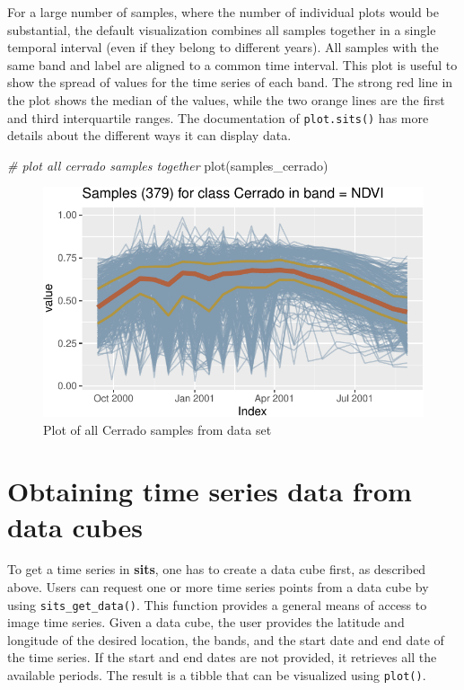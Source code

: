 \documentclass[a4paper,]{tufte-book}
\newenvironment{Shaded}{}{}
\newcommand{\CommentTok}[1]{\textcolor[rgb]{0.38,0.63,0.69}{\textit{#1}}}
\newcommand{\FunctionTok}[1]{\textcolor[rgb]{0.02,0.16,0.49}{#1}}
\newcommand{\NormalTok}[1]{#1}
\begin{document}
For a large number of samples, where the number of individual plots would be substantial, the default visualization combines all samples together in a single temporal interval (even if they belong to different years). All samples with the same band and label are aligned to a common time interval. This plot is useful to show the spread of values for the time series of each band. The strong red line in the plot shows the median of the values, while the two orange lines are the first and third interquartile ranges. The documentation of \texttt{plot.sits()} has more details about the different ways it can display data.

\begin{Shaded}
\begin{Highlighting}[]
\CommentTok{\# plot all cerrado samples together}
\FunctionTok{plot}\NormalTok{(samples\_cerrado)}
\end{Highlighting}
\end{Shaded}

\begin{figure}

{\centering \includegraphics[width=0.7\linewidth]{sitsbook_files/figure-latex/unnamed-chunk-29-1} 

}

\caption[Plot of all Cerrado samples from data set]{Plot of all Cerrado samples from data set}\label{fig:unnamed-chunk-29}
\end{figure}

\hypertarget{obtaining-time-series-data-from-data-cubes}{%
\section{Obtaining time series data from data cubes}\label{obtaining-time-series-data-from-data-cubes}}

To get a time series in \textbf{sits}, one has to create a data cube first, as described above. Users can request one or more time series points from a data cube by using \texttt{sits\_get\_data()}. This function provides a general means of access to image time series. Given a data cube, the user provides the latitude and longitude of the desired location, the bands, and the start date and end date of the time series. If the start and end dates are not provided, it retrieves all the available periods. The result is a tibble that can be visualized using \texttt{plot()}.
\end{document}

